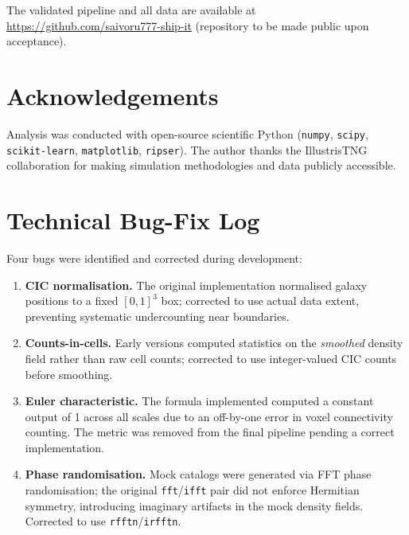 \documentclass[12pt,a4paper]{article}
\begin{document}
The validated pipeline and all data are available at
\url{https://github.com/saivoru777-ship-it}
(repository to be made public upon acceptance).

\section*{Acknowledgements}
Analysis was conducted with open-source scientific Python (\texttt{numpy},
\texttt{scipy}, \texttt{scikit-learn}, \texttt{matplotlib},
\texttt{ripser}).  The author thanks the IllustrisTNG collaboration for
making simulation methodologies and data publicly accessible.




\appendix

\section{Technical Bug-Fix Log}
\label{app:bugfix}

Four bugs were identified and corrected during development:

\begin{enumerate}
  \item \textbf{CIC normalisation.}  The original implementation normalised
        galaxy positions to a fixed $[0,1]^3$ box; corrected to use actual data
        extent, preventing systematic undercounting near boundaries.

  \item \textbf{Counts-in-cells.}  Early versions computed statistics on the
        \emph{smoothed} density field rather than raw cell counts; corrected to
        use integer-valued CIC counts before smoothing.

  \item \textbf{Euler characteristic.}  The formula implemented computed a
        constant output of 1 across all scales due to an off-by-one error in
        voxel connectivity counting.  The metric was removed from the final
        pipeline pending a correct implementation.

  \item \textbf{Phase randomisation.}  Mock catalogs were generated via FFT
        phase randomisation; the original \texttt{fft}/\texttt{ifft} pair did
        not enforce Hermitian symmetry, introducing imaginary artifacts in the
        mock density fields.  Corrected to use \texttt{rfftn}/\texttt{irfftn}.
\end{enumerate}
\end{document}
